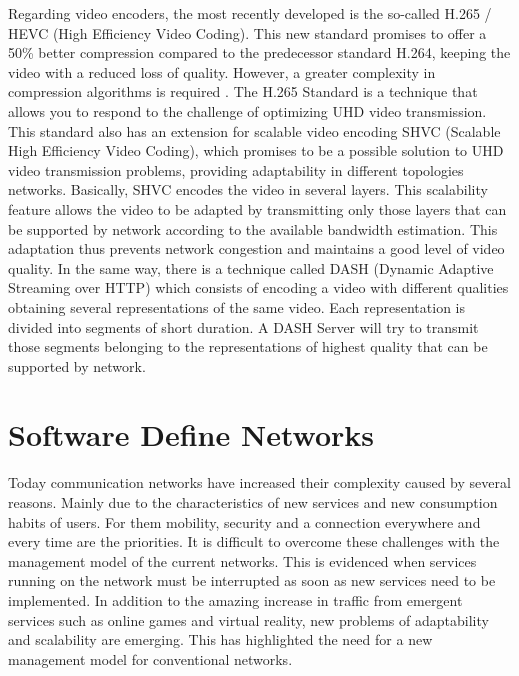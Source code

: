 Regarding video encoders, the most recently developed is the so-called H.265 / HEVC (High Efficiency Video Coding). This new standard promises to offer a 50\% better compression compared to the predecessor standard H.264, keeping the video with a reduced loss of quality. However, a greater complexity in compression algorithms is required  \cite{ye-kui_2016}. The H.265 Standard is a technique that allows you to respond to the challenge of optimizing UHD video transmission. This standard also has an extension for scalable video encoding SHVC (Scalable High Efficiency Video Coding), which promises to be a possible solution to UHD video transmission problems, providing adaptability in different topologies networks. Basically, SHVC encodes the video in several layers. This scalability feature allows the video to be adapted by transmitting only those layers that can be supported by network according to the available bandwidth estimation. This adaptation thus prevents network congestion and maintains a good level of video quality. In the same way, there is a technique called DASH (Dynamic Adaptive Streaming over HTTP) which consists of encoding a video with different qualities obtaining several representations of the same video. Each representation is divided into segments of short duration. A DASH Server will try to transmit those segments belonging to the representations of highest quality that can be supported by network.

\section{Software Define Networks}
\label{sec:4.3}

Today communication networks have increased their complexity caused by several reasons. Mainly due to the characteristics of new services and new consumption habits of users. For them mobility, security and a connection everywhere and every time are the priorities. It is difficult to overcome these challenges with the management model of the current networks. This is evidenced when services running on the network must be interrupted as soon as new services need to be implemented. In addition to the amazing increase in traffic from emergent services such as online games and virtual reality, new problems of adaptability and scalability are emerging. This has highlighted the need for a new management model for conventional networks.

